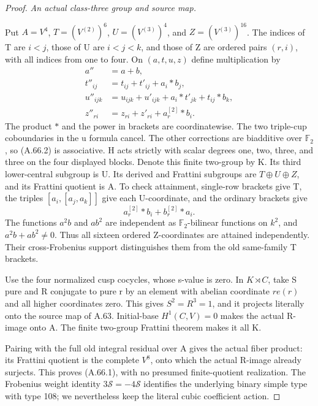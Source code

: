 \begin{proof}
\emph{An actual class-three group and source map.}\par
Put \(A=V^4\), \(T=(V^{(2)})^6\),
\(U=(V^{(3)})^4\), and \(Z=(V^{(3)})^{16}\).
The indices of T are \(i<j\), those of U are \(i<j<k\), and
those of Z are ordered pairs \((r,i)\), with all indices from one
to four. On \((a,t,u,z)\) define multiplication by
\[
 \begin{aligned}
 a''&=a+b,\\
 t''_{ij}&=t_{ij}+t'_{ij}+a_i*b_j,\\
 u''_{ijk}&=u_{ijk}+u'_{ijk}+a_i*t'_{jk}+t_{ij}*b_k,\\
 z''_{ri}&=z_{ri}+z'_{ri}+a_r^{[2]}*b_i.
 \end{aligned}
 \tag{A.66.2}
\]
The product \(*\) and the power in brackets are coordinatewise.
The two triple-cup coboundaries in the u formula cancel. The other
corrections are biadditive over \(\mathbb F_2\), so (A.66.2) is
associative. H acts strictly with scalar degrees one, two, three,
and three on the four displayed blocks. Denote this finite two-group
by K. Its third lower-central subgroup is U. Its derived and
Frattini subgroups are \(T\oplus U\oplus Z\), and its Frattini
quotient is A. To check attainment, single-row brackets give T,
the triples \([a_i,[a_j,a_k]]\) give each U-coordinate, and the
ordinary brackets give
\[
 a_r^{[2]}*b_i+b_r^{[2]}*a_i.
 \tag{A.66.3}
\]
The functions \(a^2b\) and \(ab^2\) are independent as
\(\mathbb F_2\)-bilinear functions on \(k^2\), and
\(a^2b+ab^2\ne0\). Thus all sixteen ordered Z-coordinates
are attained independently. Their cross-Frobenius support
distinguishes them from the old same-family T brackets.

Use the four normalized cusp cocycles, whose s-value is zero.
In \(K\rtimes C\), take S pure and R conjugate to pure r by
an element with abelian coordinate \(r e(r)\) and all higher
coordinates zero. This gives \(S^2=R^3=1\), and it projects
literally onto the source map of A.63. Initial-base
\(H^1(C,V)=0\) makes the actual R-image onto A. The finite
two-group Frattini theorem makes it all K.

Pairing with the full old integral residual over A gives the
actual fiber product: its Frattini quotient is the complete
\(V^8\), onto which the actual R-image already surjects.
This proves (A.66.1), with no presumed finite-quotient realization.
The Frobenius weight identity \(3\mathcal S=-4\mathcal S\)
identifies the underlying binary simple type with type 108;
we nevertheless keep the literal cubic coefficient action.


\end{proof}
